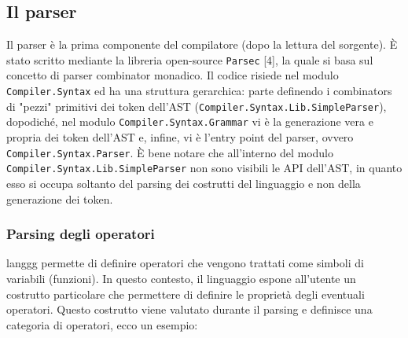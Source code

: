 \documentclass[10pt,a4paper]{article}
\begin{document}

\subsection{Il parser}
Il parser è la prima componente del compilatore (dopo la lettura del sorgente). \`E stato scritto mediante la libreria
open-source \texttt{Parsec} [4], la quale si basa sul concetto di parser combinator monadico. Il codice risiede nel
modulo \texttt{Compiler.Syntax} ed ha una struttura gerarchica: parte definendo i combinators di "pezzi" primitivi dei
token dell'AST (\texttt{Compiler.Syntax.Lib.SimpleParser}), dopodiché, nel modulo \texttt{Compiler.Syntax.Grammar} vi
è la generazione vera e propria dei token dell'AST e, infine, vi è l'entry point del parser, ovvero
\texttt{Compiler.Syntax.Parser}. \`E bene notare che all'interno del modulo \texttt{Compiler.Syntax.Lib.SimpleParser}
non sono visibili le API dell'AST, in quanto esso si occupa soltanto del parsing dei costrutti del linguaggio e non
della generazione dei token.

\subsubsection{Parsing degli operatori}
langgg permette di definire operatori che vengono trattati come simboli di variabili (funzioni). In questo contesto,
il linguaggio espone all'utente un costrutto particolare che permettere di definire le proprietà degli eventuali
operatori. Questo costrutto viene valutato durante il parsing e definisce una categoria di operatori, ecco un esempio:
\end{document}

